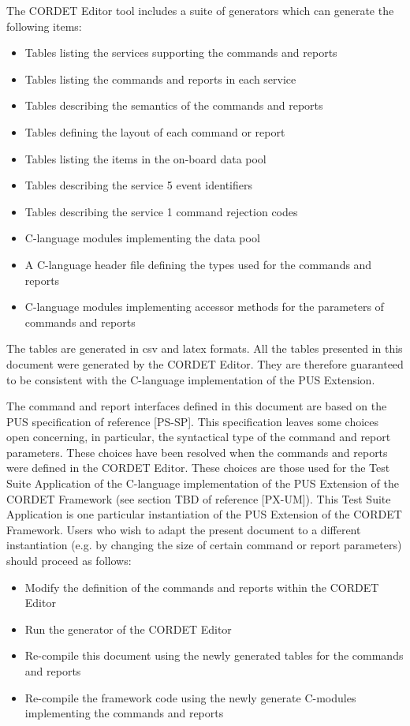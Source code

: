 \documentclass{pnp_article}
\begin{document}
The CORDET Editor tool includes a suite of generators which can generate the following items:

\begin{itemize}
\item Tables listing the services supporting the commands and reports
\item Tables listing the commands and reports in each service
\item Tables describing the semantics of the commands and reports 
\item Tables defining the layout of each command or report
\item Tables listing the items in the on-board data pool
\item Tables describing the service 5 event identifiers 
\item Tables describing the service 1 command rejection codes 
\item C-language modules implementing the data pool
\item A C-language header file defining the types used for the commands and reports
\item C-language modules implementing accessor methods for the parameters of commands and reports
\end{itemize}

The tables are generated in csv and latex formats. All the tables presented in this document were generated by the CORDET Editor. They are therefore guaranteed to be consistent with the C-language implementation of the PUS Extension. 

The command and report interfaces defined in this document are based on the PUS specification of reference [PS-SP]. This specification leaves some choices open concerning, in particular, the syntactical type of the command and report parameters. These choices have been resolved when the commands and reports were defined in the CORDET Editor. These choices are those used for the Test Suite Application of the C-language implementation of the PUS Extension of the CORDET Framework (see section TBD of reference [PX-UM]). This Test Suite Application is one particular instantiation of the PUS Extension of the CORDET Framework. Users who wish to adapt the present document to a different instantiation (e.g. by changing the size of certain command or report parameters) should proceed as follows:

\begin{itemize}
\item Modify the definition of the commands and reports within the CORDET Editor
\item Run the generator of the CORDET Editor
\item Re-compile this document using the newly generated tables for the commands and reports
\item Re-compile the framework code using the newly generate C-modules implementing the commands and reports
\end{itemize}
\end{document}
